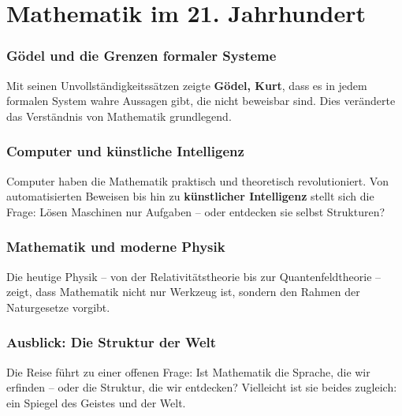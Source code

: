
\chapter{Mathematik im 21. Jahrhundert}
\label{chap:VIII_21jh}
\label{chap:VII_philosophie}
\label{chap:VIII_ausblick}
\setcounter{section}{8}
\setcounter{subsection}{0}
\setcounter{subsubsection}{1}
\setcounter{secnumdepth}{3}



\subsection{Gödel und die Grenzen formaler Systeme}
Mit seinen Unvollständigkeitssätzen zeigte \textbf{Gödel, Kurt}, 
dass es in jedem formalen System wahre Aussagen gibt, die nicht beweisbar sind. 
Dies veränderte das Verständnis von Mathematik grundlegend. 

\subsection{Computer und künstliche Intelligenz}
Computer haben die Mathematik praktisch und theoretisch revolutioniert. 
Von automatisierten Beweisen bis hin zu \textbf{künstlicher Intelligenz} 
stellt sich die Frage: Lösen Maschinen nur Aufgaben – oder entdecken sie selbst Strukturen? 

\subsection{Mathematik und moderne Physik}
Die heutige Physik – von der Relativitätstheorie bis zur Quantenfeldtheorie – 
zeigt, dass Mathematik nicht nur Werkzeug ist, sondern den Rahmen der Naturgesetze vorgibt. 

\subsection{Ausblick: Die Struktur der Welt}
Die Reise führt zu einer offenen Frage: 
Ist Mathematik die Sprache, die wir erfinden – oder die Struktur, die wir entdecken? 
Vielleicht ist sie beides zugleich: ein Spiegel des Geistes und der Welt. 
